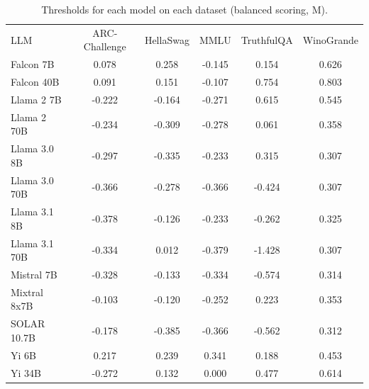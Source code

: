 \begin{table}[h]
\caption{Thresholds for each model on each dataset (balanced scoring, M). }
\label{tab:thresholds_prob_entropy_k20_w1}
\centering
\begin{tabular}{l S[table-format=3.1] S[table-format=3.1] S[table-format=3.1] S[table-format=3.1] S[table-format=3.1]}
\toprule
LLM & ARC-Challenge & HellaSwag & MMLU & TruthfulQA & WinoGrande \\ 
\cmidrule(lr){1-1} \cmidrule(lr){2-2} \cmidrule(lr){3-3} \cmidrule(lr){4-4} \cmidrule(lr){5-5} \cmidrule(lr){6-6}
Falcon 7B & 0.078 & 0.258 & -0.145 & 0.154 & 0.626\\
Falcon 40B & 0.091 & 0.151 & -0.107 & 0.754 & 0.803\\
Llama 2 7B & -0.222 & -0.164 & -0.271 & 0.615 & 0.545\\
Llama 2 70B & -0.234 & -0.309 & -0.278 & 0.061 & 0.358\\
Llama 3.0 8B & -0.297 & -0.335 & -0.233 & 0.315 & 0.307\\
Llama 3.0 70B & -0.366 & -0.278 & -0.366 & -0.424 & 0.307\\
Llama 3.1 8B & -0.378 & -0.126 & -0.233 & -0.262 & 0.325\\
Llama 3.1 70B & -0.334 & 0.012 & -0.379 & -1.428 & 0.307\\
Mistral 7B & -0.328 & -0.133 & -0.334 & -0.574 & 0.314\\
Mixtral 8x7B & -0.103 & -0.120 & -0.252 & 0.223 & 0.353\\
SOLAR 10.7B & -0.178 & -0.385 & -0.366 & -0.562 & 0.312\\
Yi 6B & 0.217 & 0.239 & 0.341 & 0.188 & 0.453\\
Yi 34B & -0.272 & 0.132 & 0.000 & 0.477 & 0.614\\
\bottomrule
\end{tabular}
\end{table}
